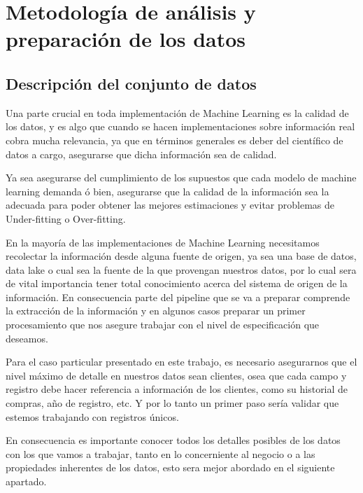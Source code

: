 
\chapter{Metodología de análisis y preparación de los datos}

\section{Descripción del conjunto de datos}

Una parte crucial en toda implementación de Machine Learning es la calidad de los datos, y es algo que cuando se hacen implementaciones sobre información real cobra mucha relevancia, ya que en términos generales es deber del científico de datos a cargo, asegurarse que dicha información sea de calidad.

Ya sea asegurarse del cumplimiento de los supuestos que cada modelo de machine learning demanda ó bien, asegurarse que la calidad de la información sea la adecuada para poder obtener las mejores estimaciones y evitar problemas de Under-fitting o Over-fitting.


En la mayoría de las implementaciones de Machine Learning necesitamos recolectar la información desde alguna fuente de origen, ya sea una base de datos, data lake o cual sea la fuente de la que provengan nuestros datos, por lo cual sera de vital importancia tener total conocimiento acerca del sistema de origen de la información. En consecuencia parte del pipeline que se va a preparar comprende la extracción de la información y en algunos casos preparar un primer procesamiento que nos asegure trabajar con el nivel de especificación que deseamos.

Para el caso particular presentado en este trabajo, es necesario asegurarnos que el nivel máximo de detalle en nuestros datos sean clientes, osea que cada campo y registro debe hacer referencia a información de los clientes, como su historial de compras, año de registro, etc. Y por lo tanto un primer paso sería validar que estemos trabajando con registros únicos.

En consecuencia es importante conocer todos los detalles posibles de los datos con los que vamos a trabajar, tanto en lo concerniente al negocio o a las propiedades inherentes de los datos, esto sera mejor abordado en el siguiente apartado.

